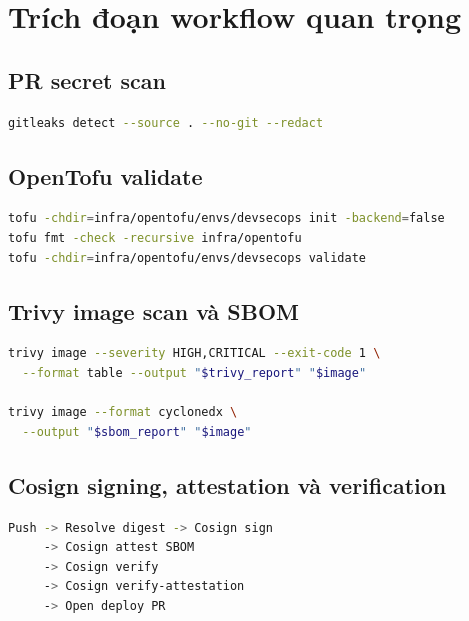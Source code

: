 \chapter{Trích đoạn workflow quan trọng}
\label{appendix:workflow-snippets}

\section{PR secret scan}

\begin{lstlisting}[language=bash,caption={Gitleaks secret scan trong PR}]
gitleaks detect --source . --no-git --redact
\end{lstlisting}

\section{OpenTofu validate}

\begin{lstlisting}[language=bash,caption={OpenTofu validate trong CI}]
tofu -chdir=infra/opentofu/envs/devsecops init -backend=false
tofu fmt -check -recursive infra/opentofu
tofu -chdir=infra/opentofu/envs/devsecops validate
\end{lstlisting}

\section{Trivy image scan và SBOM}

\begin{lstlisting}[language=bash,caption={Quét image và tạo SBOM bằng Trivy}]
trivy image --severity HIGH,CRITICAL --exit-code 1 \
  --format table --output "$trivy_report" "$image"

trivy image --format cyclonedx \
  --output "$sbom_report" "$image"
\end{lstlisting}

\section{Cosign signing, attestation và verification}

\begin{lstlisting}[language=bash,caption={Thứ tự Cosign trong CD workflow}]
Push -> Resolve digest -> Cosign sign
     -> Cosign attest SBOM
     -> Cosign verify
     -> Cosign verify-attestation
     -> Open deploy PR
\end{lstlisting}

